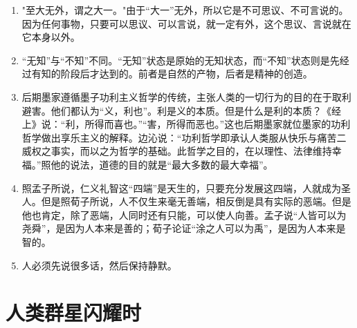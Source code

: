 \documentclass[UTF8]{ctexart}
\begin{document}
\begin{enumerate}
			\item "至大无外，谓之大一。"由于“大一”无外，所以它是不可思议、不可言说的。因为任何事物，只要可以思议、可以言说，就一定有外，这个思议、言说就在它本身以外。
			
			\item “无知”与“不知”不同。“无知”状态是原始的无知状态，而“不知”状态则是先经过有知的阶段后才达到的。前者是自然的产物，后者是精神的创造。
			
			\item   后期墨家遵循墨子功利主义哲学的传统，主张人类的一切行为的目的在于取利避害。他们都认为“义，利也”。利是义的本质。但是什么是利的本质？《经上》说：“利，所得而喜也。”“害，所得而恶也。”这也后期墨家就位墨家的功利哲学做出享乐主义的解释。边沁说：“功利哲学即承认人类服从快乐与痛苦二威权之事实，而以之为哲学的基础。此哲学之目的，在以理性、法律维持幸福。”照他的说法，道德的目的就是“最大多数的最大幸福”。
			
			\item 照孟子所说，仁义礼智这“四端”是天生的，只要充分发展这四端，人就成为圣人。但是照荀子所说，人不仅生来毫无善端，相反倒是具有实际的恶端。但是他也肯定，除了恶端，人同时还有只能，可以使人向善。孟子说“人皆可以为尧舜”，是因为人本来是善的；荀子论证“涂之人可以为禹”，是因为人本来是智的。
			
			\item 人必须先说很多话，然后保持静默。
			
			
		\end{enumerate}
	
	\newpage
	
	\section{人类群星闪耀时}	
			
			
\end{document}
